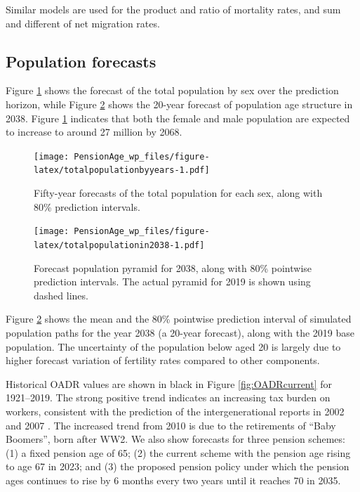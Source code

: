 \documentclass[11pt,a4paper,]{article}
\begin{document}
Similar models are used for the product and ratio of mortality rates, and sum and different of net migration rates.

\hypertarget{population-forecasts}{%
\subsection{Population forecasts}\label{population-forecasts}}

Figure \ref{fig:totalpopulationbyyears} shows the forecast of the total population by sex over the prediction horizon, while Figure \ref{fig:totalpopulationin2038} shows the 20-year forecast of population age structure in 2038. Figure \ref{fig:totalpopulationbyyears} indicates that both the female and male population are expected to increase to around 27 million by 2068.

\begin{figure}
\centering
\texttt{[image: PensionAge\_wp\_files/figure-latex/totalpopulationbyyears-1.pdf]}
\caption{\label{fig:totalpopulationbyyears}Fifty-year forecasts of the total population for each sex, along with 80\% prediction intervals.}
\end{figure}

\begin{figure}
\centering
\texttt{[image: PensionAge\_wp\_files/figure-latex/totalpopulationin2038-1.pdf]}
\caption{\label{fig:totalpopulationin2038}Forecast population pyramid for 2038, along with 80\% pointwise prediction intervals. The actual pyramid for 2019 is shown using dashed lines.}
\end{figure}

Figure \ref{fig:totalpopulationin2038} shows the mean and the 80\% pointwise prediction interval of simulated population paths for the year 2038 (a 20-year forecast), along with the 2019 base population. The uncertainty of the population below aged 20 is largely due to higher forecast variation of fertility rates compared to other components.

Historical OADR values are shown in black in Figure \ref{fig:OADRcurrent} for 1921--2019. The strong positive trend indicates an increasing tax burden on workers, consistent with the prediction of the intergenerational reports in 2002 \autocite{IGR02} and 2007 \autocite{IGR07}. The increased trend from 2010 is due to the retirements of ``Baby Boomers'', born after WW2. We also show forecasts for three pension schemes: (1) a fixed pension age of 65; (2) the current scheme with the pension age rising to age 67 in 2023; and (3) the proposed pension policy under which the pension ages continues to rise by 6 months every two years until it reaches 70 in 2035.
\end{document}

